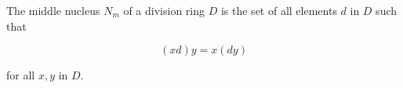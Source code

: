 The middle nucleus $N_m$ of a division ring $D$ is the set of all elements $d$ in $D$ such that

$$(xd)y = x(dy)$$

for all $x, y$ in $D$.
